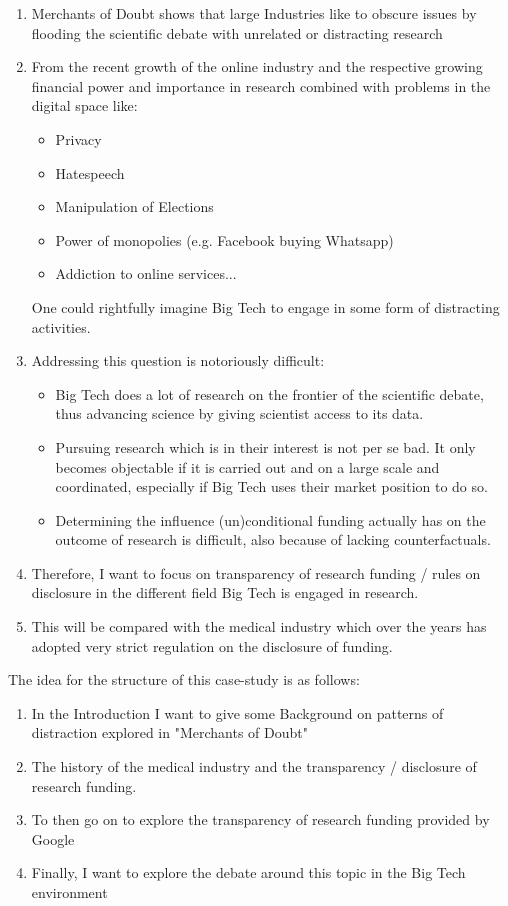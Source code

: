 \begin{enumerate}
    \item Merchants of Doubt shows that large Industries like to obscure issues by flooding the scientific debate with unrelated or distracting research
    \item From the recent growth of the online industry and the respective growing financial power and importance in research combined with problems in the digital space like: \begin{itemize}
        \item Privacy
        \item Hatespeech
        \item Manipulation of Elections 
        \item Power of monopolies (e.g. Facebook buying Whatsapp)
        \item Addiction to online services...
    \end{itemize} One could rightfully imagine Big Tech to engage in some form of distracting activities. 
    \item Addressing this question is notoriously difficult:\begin{itemize}
        \item Big Tech does a lot of research on the frontier of the scientific debate, thus advancing science by giving scientist access to its data.
        \item Pursuing research which is in their interest is not per se bad. It only becomes objectable if it is carried out and on a large scale and coordinated, especially if Big Tech uses their market position to do so. 
        \item Determining the influence (un)conditional funding actually has on the outcome of research is difficult, also because of lacking counterfactuals. 
    \end{itemize} 
    \item Therefore, I want to focus on transparency of research funding / rules on disclosure in the different field Big Tech is engaged in research.
    \item This will be compared with the medical industry which over the years has adopted very strict regulation on the disclosure of funding.
\end{enumerate}

The idea for the structure of this case-study is as follows:
\begin{enumerate}
    \item In the Introduction I want to give some Background on patterns of distraction explored in "Merchants of Doubt"
    \item The history of the medical industry and the transparency / disclosure of research funding.
    \item To then go on to explore the transparency of research funding provided by Google
    \item Finally, I want to explore the debate around this topic in the Big Tech environment
\end{enumerate}


